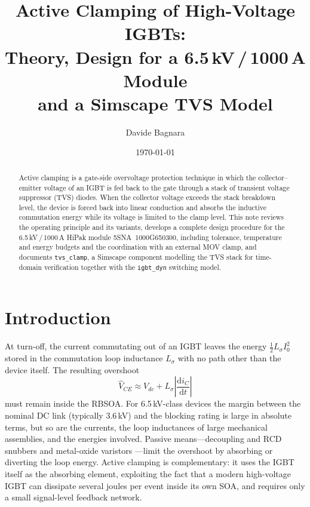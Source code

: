 \documentclass[11pt,a4paper]{article}
\title{Active Clamping of High-Voltage IGBTs:\\
Theory, Design for a 6.5\,kV\,/\,1000\,A Module\\
and a Simscape TVS Model}
\author{Davide Bagnara}
\date{\today}
\newcommand{\ud}{\mathrm{d}}
\begin{document}
\maketitle

\begin{abstract}
Active clamping is a gate-side overvoltage protection technique in which
the collector--emitter voltage of an IGBT is fed back to the gate through
a stack of transient voltage suppressor (TVS) diodes. When the collector
voltage exceeds the stack breakdown level, the device is forced back into
linear conduction and absorbs the inductive commutation energy while its
voltage is limited to the clamp level. This note reviews the operating
principle and its variants, develops a complete design procedure for the
6.5\,kV\,/\,1000\,A HiPak module 5SNA~1000G650300, including tolerance,
temperature and energy budgets and the coordination with an external MOV
clamp, and documents \texttt{tvs\_clamp}, a Simscape component modelling
the TVS stack for time-domain verification together with the
\texttt{igbt\_dyn} switching model.
\end{abstract}

\tableofcontents

\section{Introduction}

At turn-off, the current commutating out of an IGBT leaves the energy
$\tfrac{1}{2}L_\sigma I_0^2$ stored in the commutation loop inductance
$L_\sigma$ with no path other than the device itself. The resulting
overshoot
%
\begin{equation}
  \hat{V}_{CE} \approx V_{dc} + L_\sigma \left|\frac{\ud i_C}{\ud t}\right|
  \label{eq:overshoot}
\end{equation}
%
must remain inside the RBSOA. For 6.5\,kV-class devices the margin
between the nominal DC link (typically 3.6\,kV) and the blocking rating
is large in absolute terms, but so are the currents, the loop
inductances of large mechanical assemblies, and the energies involved.
Passive means---decoupling and RCD snubbers \cite{snubdes,snubpar} and
metal-oxide varistors \cite{movnote}---limit the overshoot by absorbing
or diverting the loop energy. Active clamping is complementary: it uses
the IGBT itself as the absorbing element, exploiting the fact that a
modern high-voltage IGBT can dissipate several joules per event inside
its own SOA, and requires only a small signal-level feedback network.
\end{document}
